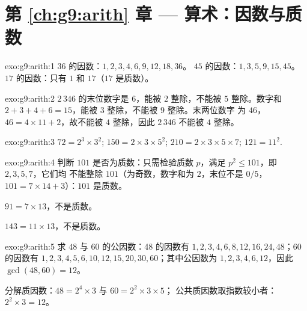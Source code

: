 \section*{第 \ref{ch:g9:arith} 章 --- 算术：因数与质数}

\begin{solution}{exo:g9:arith:1}
$36$ 的因数：$1, 2, 3, 4, 6, 9, 12, 18, 36$。
$45$ 的因数：$1, 3, 5, 9, 15, 45$。
$17$ 的因数：只有 $1$ 和 $17$（$17$ 是质数）。
\end{solution}

\begin{solution}{exo:g9:arith:2}
$2\,346$ 的末位数字是 $6$，能被 $2$ 整除，不能被 $5$ 整除。数字和
$2 + 3 + 4 + 6 = 15$，能被 $3$ 整除，不能被 $9$ 整除。末两位数字
为 $46$，$46 = 4 \times 11 + 2$，故不能被 $4$ 整除，因此 $2\,346$
不能被 $4$ 整除。
\end{solution}

\begin{solution}{exo:g9:arith:3}
$72 = 2^3 \times 3^2$; \quad
$150 = 2 \times 3 \times 5^2$; \quad
$210 = 2 \times 3 \times 5 \times 7$; \quad
$121 = 11^2$.
\end{solution}

\begin{solution}{exo:g9:arith:4}
判断 $101$ 是否为质数：只需检验质数 $p$，满足 $p^2 \leq 101$，即 $2, 3, 5, 7$，它们均
不能整除 $101$（为奇数，数字和为 $2$，末位不是 $0/5$，
$101 = 7 \times 14 + 3$）：$101$ 是质数。

$91 = 7 \times 13$，不是质数。

$143 = 11 \times 13$，不是质数。
\end{solution}

\begin{solution}{exo:g9:arith:5}
求 $48$ 与 $60$ 的公因数：48 的因数有 $1, 2, 3, 4, 6, 8,
12, 16, 24, 48$；$60$ 的因数有 $1, 2, 3, 4, 5, 6, 10, 12, 15, 20,
30, 60$；其中公因数为 $1, 2, 3, 4, 6, 12$，因此 $\gcd(48,60) = 12$。

分解质因数：$48 = 2^4 \times 3$ 与 $60 = 2^2 \times 3 \times 5$；
公共质因数取指数较小者：$2^2 \times 3 = 12$。
\end{solution}

